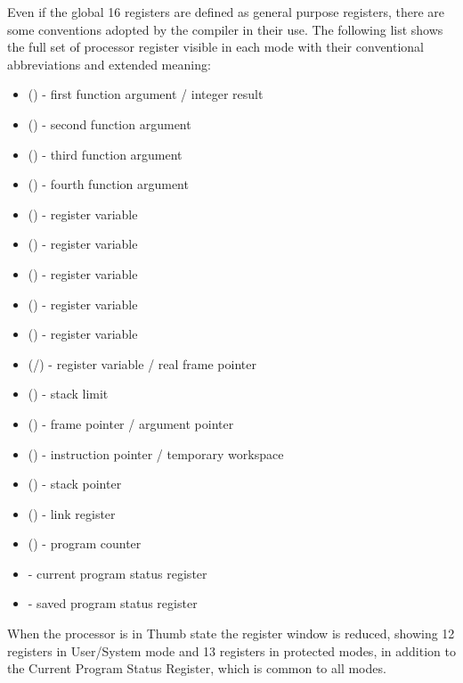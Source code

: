 Even if the global 16 registers are defined as general purpose registers, there are some conventions adopted by the compiler in their use. The following list shows the full set of processor register visible in each mode with their conventional abbreviations and extended meaning:

\begin{itemize}
	\item {} () - first function argument / integer result
	\item {} () - second function argument
	\item {} () - third function argument
	\item {} () - fourth function argument
	\item {} () - register variable
	\item {} () - register variable
	\item {} () - register variable
	\item {} () - register variable
	\item {} () - register variable
	\item {} (/) - register variable / real frame pointer
	\item {} () - stack limit
	\item {} () - frame pointer / argument pointer
	\item {} () - instruction pointer / temporary workspace
	\item {} () - stack pointer
	\item {} () - link register
	\item {} () - program counter
	\item {} - current program status register
	\item {} - saved program status register
\end{itemize}

When the processor is in Thumb state the register window is reduced, showing 12 registers in User/System mode and 13 registers in protected modes, in addition to the Current Program Status Register, which is common to all modes. 

